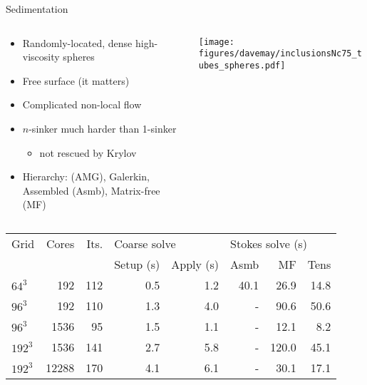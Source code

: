 \documentclass{beamer}
\begin{document}
\begin{frame}{Sedimentation}
  \begin{columns}
    \begin{column}{0.6\textwidth}
      \begin{itemize}
      \item Randomly-located, dense high-viscosity spheres
      \item Free surface (it matters)
      \item Complicated non-local flow
      \item $n$-sinker much harder than 1-sinker
        \begin{itemize}
        \item not rescued by Krylov
        \end{itemize}
      \item Hierarchy: (AMG), Galerkin, Assembled (Asmb), Matrix-free (MF)
      \end{itemize}
    \end{column}
    \begin{column}{0.4\textwidth}
      \texttt{[image: figures/davemay/inclusionsNc75\_tubes\_spheres.pdf]}
    \end{column}
  \end{columns}
  \begin{tabular}{l r r rr rrr}
    \toprule
    Grid  &Cores  &Its.  &\multicolumn{2}{l}{Coarse solve}   &\multicolumn{3}{l}{Stokes solve (s)}  \\
          &            &      &Setup (s) &Apply (s)                      &Asmb   &MF    &Tens   \\
    \midrule
    $64^3$	&192 &112	&0.5  &1.2		&40.1 &26.9 &14.8 \\
    $96^3$	&192 &110	&1.3  &4.0		&- &90.6 &50.6 \\
    $96^3$	&1536 &95	&1.5  &1.1		&- &12.1 &8.2 \\
    $192^3$	&1536 &141	&2.7  &5.8		&- &120.0 &45.1 \\
    $192^3$	&12288 &170	&4.1  &6.1		&- &30.1 &17.1 \\
    \bottomrule
  \end{tabular}
\end{frame}
\end{document}
